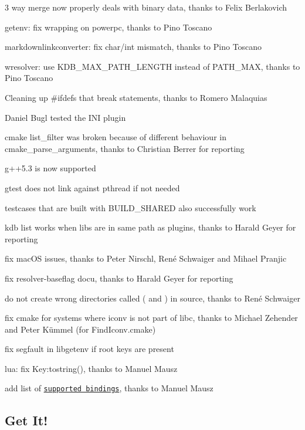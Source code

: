 \begin{DoxyItemize}
\item 3 way merge now properly deals with binary data, thanks to Felix Berlakovich
\item getenv\+: fix wrapping on powerpc, thanks to Pino Toscano
\item markdownlinkconverter\+: fix char/int mismatch, thanks to Pino Toscano
\item wresolver\+: use K\+D\+B\+\_\+\+M\+A\+X\+\_\+\+P\+A\+T\+H\+\_\+\+L\+E\+N\+G\+TH instead of P\+A\+T\+H\+\_\+\+M\+AX, thanks to Pino Toscano
\item Cleaning up \#ifdefs that break statements, thanks to Romero Malaquias
\item Daniel Bugl tested the I\+NI plugin
\item cmake list\+\_\+filter was broken because of different behaviour in cmake\+\_\+parse\+\_\+arguments, thanks to Christian Berrer for reporting
\item g++5.3 is now supported
\item gtest does not link against pthread if not needed
\item testcases that are built with B\+U\+I\+L\+D\+\_\+\+S\+H\+A\+R\+ED also successfully work
\item kdb list works when libs are in same path as plugins, thanks to Harald Geyer for reporting
\item fix mac\+OS issues, thanks to Peter Nirschl, René Schwaiger and Mihael Pranjic
\item fix resolver-\/baseflag docu, thanks to Harald Geyer for reporting
\item do not create wrong directories called {\ttfamily (} and {\ttfamily )} in source, thanks to René Schwaiger
\item fix cmake for systems where iconv is not part of libc, thanks to Michael Zehender and Peter Kümmel (for Find\+Iconv.\+cmake)
\item fix segfault in libgetenv if root keys are present
\item lua\+: fix Key\+:tostring(), thanks to Manuel Mausz
\item add list of \href{https://github.com/ElektraInitiative/libelektra/tree/master/src/bindings}{\tt supported bindings}, thanks to Manuel Mausz
\end{DoxyItemize}

\subsection*{Get It!}

